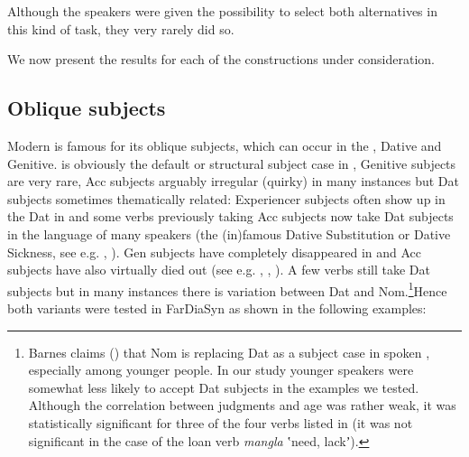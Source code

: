 \documentclass[output=paper]{LSP/langsci}
\begin{document}
Although the speakers were given the possibility to select both alternatives in this kind of task, they very rarely did so.

We now present the results for each of the constructions under consideration.

\subsection{Oblique subjects}\largerpage
Modern  is famous for its oblique subjects, which can occur in the , Dative and Genitive.  is obviously the default or structural subject case in , Genitive subjects are very rare, Acc subjects arguably irregular (quirky) in many instances but Dat subjects sometimes thematically related: Experiencer subjects often show up in the Dat in  and some verbs previously taking Acc subjects now take Dat subjects in the language of many speakers (the (in)famous Dative Substitution or Dative Sickness, see e.g. \citealt{ZaenenEtAl1985}, \citealt[224]{Thráinsson2007}). Gen subjects have completely disappeared in  and Acc subjects have also virtually died out (see e.g. \citealt[252--251]{Thráinsson2012}, \citealt{Jónsson2005}, \citealt{Eythorsson2015}). A few verbs still take Dat subjects but in many instances there is variation between Dat and Nom.\footnote{Barnes claims (\citeyear[28]{Barnes1992}) that Nom is replacing Dat as a subject case in spoken , especially among younger people. In our study younger speakers were somewhat less likely to accept Dat subjects in the examples we tested. Although the correlation between judgments and age was rather weak, it was statistically significant  for three of the four verbs listed in  (it was not significant in the case of the loan verb \textit{mangla} ʽneed, lackʼ).}\linebreak Hence both variants were tested in FarDiaSyn as shown in the following examples:
\end{document}
